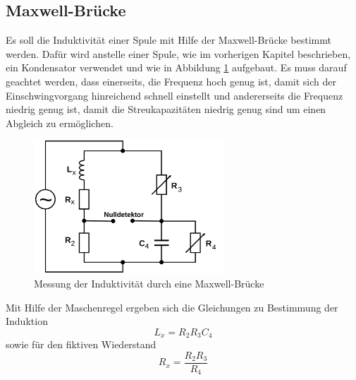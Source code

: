 \subsection{Maxwell-Brücke}
Es soll die Induktivität einer Spule mit Hilfe der Maxwell-Brücke bestimmt werden. Dafür wird anstelle einer Spule, wie im vorherigen Kapitel beschrieben, ein Kondensator verwendet und wie in Abbildung \ref{fig:Max-Br} aufgebaut. Es muss darauf geachtet werden, dass einerseits, die Frequenz hoch genug ist, damit sich der Einschwingvorgang hinreichend schnell einstellt und andererseits die Frequenz niedrig genug ist, damit die Streukapazitäten niedrig genug sind um einen Abgleich zu ermöglichen.
\begin{figure}
  \centering
  \includegraphics[height=5cm]{picture/5.png}
  \caption{Messung der Induktivität durch eine Maxwell-Brücke}
  \label{fig:Max-Br}
\end{figure}
Mit Hilfe der Maschenregel ergeben sich die Gleichungen zu Bestimmung der Induktion 
\begin{equation}
  L_x = R_2 R_3 C_4
  \label{eqn:L_x}
\end{equation}
sowie für den fiktiven Wiederstand
\begin{equation}
  R_x = \frac{R_2 R_3}{R_4}
  \label{eqn:R_M}
\end{equation}

